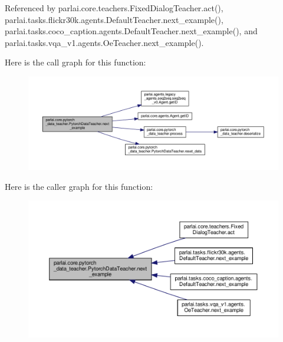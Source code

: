 Referenced by parlai.\+core.\+teachers.\+Fixed\+Dialog\+Teacher.\+act(), parlai.\+tasks.\+flickr30k.\+agents.\+Default\+Teacher.\+next\+\_\+example(), parlai.\+tasks.\+coco\+\_\+caption.\+agents.\+Default\+Teacher.\+next\+\_\+example(), and parlai.\+tasks.\+vqa\+\_\+v1.\+agents.\+Oe\+Teacher.\+next\+\_\+example().

Here is the call graph for this function\+:
\nopagebreak
\begin{figure}[H]
\begin{center}
\leavevmode
\includegraphics[width=350pt]{classparlai_1_1core_1_1pytorch__data__teacher_1_1PytorchDataTeacher_a62003fefcf480fb16038acb7e40b4f15_cgraph}
\end{center}
\end{figure}
Here is the caller graph for this function\+:
\nopagebreak
\begin{figure}[H]
\begin{center}
\leavevmode
\includegraphics[width=350pt]{classparlai_1_1core_1_1pytorch__data__teacher_1_1PytorchDataTeacher_a62003fefcf480fb16038acb7e40b4f15_icgraph}
\end{center}
\end{figure}
\mbox{\label{classparlai_1_1core_1_1pytorch__data__teacher_1_1PytorchDataTeacher_a68a9aac96f1eebc4f40e32f0ebfb5403}} 
